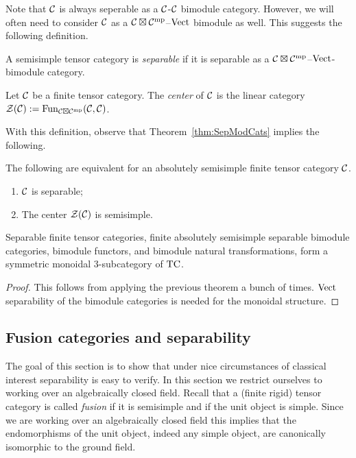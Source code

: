 \documentclass{amsart}
\begin{document}
Note that $\mathcal C$ is always seperable as a $\mathcal C$-$\mathcal C$ bimodule category.  However, we will often need to consider $\mathcal C$ as a $\mathcal C \boxtimes \mathcal C^{\mathrm{mp}}$--$\mathrm{Vect}$ bimodule as well.  This suggests the following definition.

\begin{definition}
	A semisimple tensor category is {\em separable} if it is separable as a $\mathcal C \boxtimes \mathcal C^{\mathrm{mp}}$--$\mathrm{Vect}$-bimodule category.  
\end{definition}


\begin{definition}
	Let $\mathcal C$ be a finite tensor category. The {\em center} of $\mathcal C$ is the linear category $\mathcal Z(\mathcal C) := \operatorname{Fun}_{\mathcal C \boxtimes \mathcal C^{\mathrm{mp}}}(\mathcal C, \mathcal C)$.
\end{definition}

With this definition, observe that Theorem~\ref{thm:SepModCats} implies the following.

\begin{corollary} \label{cor:Sep=semisimplecenter}
	The following are equivalent for an absolutely semisimple finite tensor category $\mathcal C$.
	\begin{enumerate}
		\item $\mathcal C$ is separable;
		\item The center $\mathcal Z(\mathcal C)$ is semisimple.
	\end{enumerate} 
\end{corollary}

\begin{theorem}
Separable finite tensor categories, finite absolutely semisimple separable bimodule categories, bimodule functors, and bimodule natural transformations, form a symmetric monoidal $3$-subcategory of $\mathrm{TC}$.
\end{theorem}
\begin{proof}
This follows from applying the previous theorem a bunch of times.  $\mathrm{Vect}$ separability of the bimodule categories is needed for the monoidal structure.  
\end{proof}


\subsection{Fusion categories and separability} \label{sec:tc-fusion}

The goal of this section is to show that under nice circumstances of classical interest  separability is easy to verify. In this section we restrict ourselves to working over an algebraically closed field. Recall that a (finite rigid) tensor category is called \emph{fusion} if it is semisimple and if the unit object is simple. Since we are working over an algebraically closed field this implies that the endomorphisms of the unit object, indeed any simple object, are canonically isomorphic to the ground field. 
\end{document}
